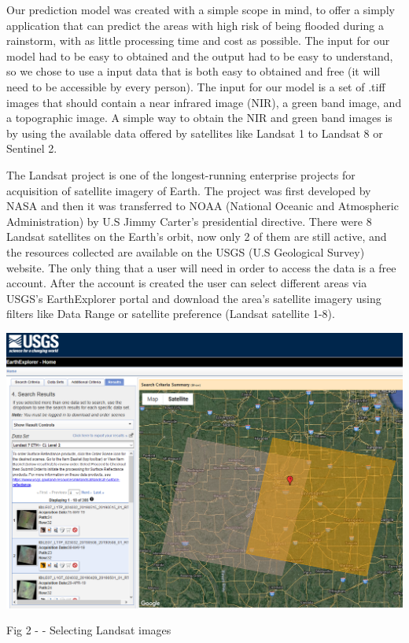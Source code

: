 \documentclass[12pt, a4paper]{report}
\begin{document}
\quad
Our prediction model was created with a simple scope in mind, to offer a simply  application that can predict the areas with high risk of being flooded during a rainstorm, with as little processing time and cost as possible. The input for our model had to be easy to obtained and the output had to be easy to understand, so we chose to use a input data that is both easy to obtained and free (it will need to be accessible by every person). The input for our model is a set of .tiff images that should contain a near infrared image (NIR), a green band image, and a topographic image. A simple way to obtain the NIR and green band images is by using the available data offered by satellites like Landsat 1 to Landsat 8 or Sentinel 2. 

\par 
The Landsat project is one of the longest-running enterprise projects for acquisition of satellite imagery of Earth. The project was first developed by NASA and then it was transferred to NOAA (National Oceanic and Atmospheric Administration) by U.S Jimmy Carter's presidential directive. There were 8 Landsat satellites on the Earth's orbit, now only 2 of them are still active, and the resources collected are available on the USGS (U.S Geological Survey) website. The only thing that a user will need in order to access the data is a free account. After the account is created the user can select different areas via USGS's EarthExplorer portal and download the area's satellite imagery using filters like Data Range or satellite preference (Landsat satellite 1-8).
\par

\bigskip

\includegraphics[scale=0.5, right]{landsat_search.png} 
\begin{center}
Fig 2 - \cite{USGS} - Selecting Landsat images
\end{center}
\end{document}
